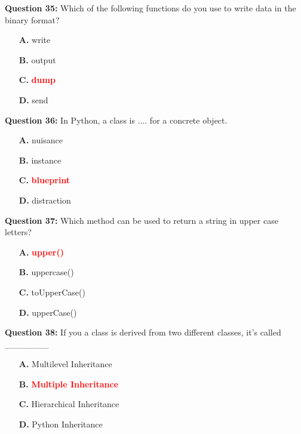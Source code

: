 \documentclass[12pt,a4paper]{article}
\begin{document}
\vspace{0.5cm}

\textbf{Question 35:} Which of the following functions do you use to write data in the binary format?

\begin{itemize}
    \item[\textbf{A.}] write
    \item[\textbf{B.}] output
    \item[\textbf{C.}] \textcolor{red}{\textbf{dump}}
    \item[\textbf{D.}] send
\end{itemize}

\vspace{0.5cm}

\textbf{Question 36:} In Python, a class is .... for a concrete object.

\begin{itemize}
    \item[\textbf{A.}] nuisance
    \item[\textbf{B.}] instance
    \item[\textbf{C.}] \textcolor{red}{\textbf{blueprint}}
    \item[\textbf{D.}] distraction
\end{itemize}

\vspace{0.5cm}

\textbf{Question 37:} Which method can be used to return a string in upper case letters?

\begin{itemize}
    \item[\textbf{A.}] \textcolor{red}{\textbf{upper()}}
    \item[\textbf{B.}] uppercase()
    \item[\textbf{C.}] toUpperCase()
    \item[\textbf{D.}] upperCase()
\end{itemize}

\vspace{0.5cm}

\textbf{Question 38:} If you a class is derived from two different classes, it's called _______

\begin{itemize}
    \item[\textbf{A.}] Multilevel Inheritance
    \item[\textbf{B.}] \textcolor{red}{\textbf{Multiple Inheritance}}
    \item[\textbf{C.}] Hierarchical Inheritance
    \item[\textbf{D.}] Python Inheritance
\end{itemize}
\end{document}
